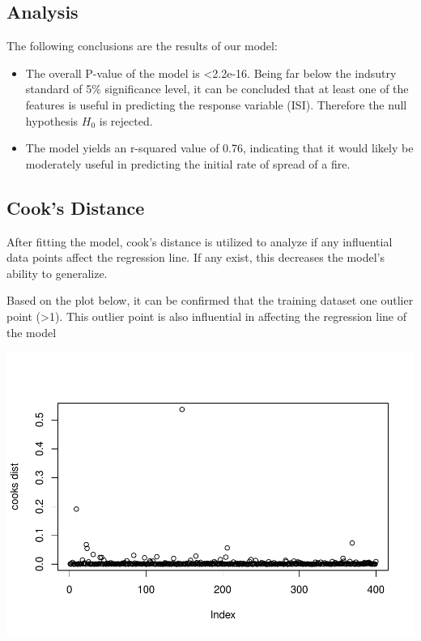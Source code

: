 \documentclass[conference,final,]{IEEEtran}
\makeatletter
\def\maxwidth{\ifdim\Gin@nat@width>\linewidth\linewidth
\else\Gin@nat@width\fi}
\let\Oldincludegraphics\includegraphics
\renewcommand{\includegraphics}[1]{\Oldincludegraphics[width=\maxwidth]{#1}}
\makeatother
\begin{document}
\hypertarget{analysis}{%
\subsection{Analysis}\label{analysis}}

The following conclusions are the results of our model:

\begin{itemize}
\item
  The overall P-value of the model is \textless{}2.2e-16. Being far
  below the indsutry standard of 5\% significance level, it can be
  concluded that at least one of the features is useful in predicting
  the response variable (ISI). Therefore the null hypothesis \(H_{0}\)
  is rejected.
\item
  The model yields an r-squared value of 0.76, indicating that it would
  likely be moderately useful in predicting the initial rate of spread
  of a fire.
\end{itemize}

\hypertarget{cooks-distance}{%
\subsection{Cook's Distance}\label{cooks-distance}}

After fitting the model, cook's distance is utilized to analyze if any
influential data points affect the regression line. If any exist, this
decreases the model's ability to generalize.

Based on the plot below, it can be confirmed that the training dataset
one outlier point (\textgreater{}1). This outlier point is also
influential in affecting the regression line of the model

\includegraphics{forest_fires_files/figure-latex/unnamed-chunk-8-1.pdf}
\end{document}
